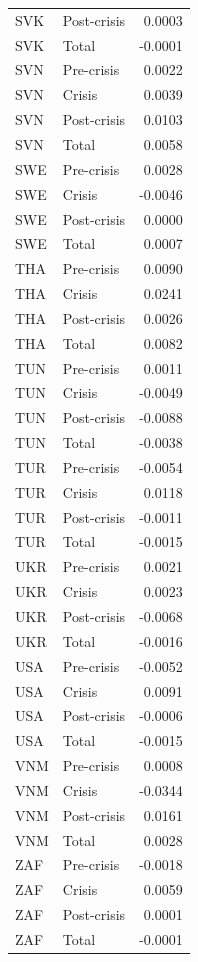\begin{longtable}[t]{llr}
SVK & Post-crisis & 0.0003\\
SVK & Total & -0.0001\\
SVN & Pre-crisis & 0.0022\\
\addlinespace
SVN & Crisis & 0.0039\\
SVN & Post-crisis & 0.0103\\
SVN & Total & 0.0058\\
SWE & Pre-crisis & 0.0028\\
SWE & Crisis & -0.0046\\
\addlinespace
SWE & Post-crisis & 0.0000\\
SWE & Total & 0.0007\\
THA & Pre-crisis & 0.0090\\
THA & Crisis & 0.0241\\
THA & Post-crisis & 0.0026\\
\addlinespace
THA & Total & 0.0082\\
TUN & Pre-crisis & 0.0011\\
TUN & Crisis & -0.0049\\
TUN & Post-crisis & -0.0088\\
TUN & Total & -0.0038\\
\addlinespace
TUR & Pre-crisis & -0.0054\\
TUR & Crisis & 0.0118\\
TUR & Post-crisis & -0.0011\\
TUR & Total & -0.0015\\
UKR & Pre-crisis & 0.0021\\
\addlinespace
UKR & Crisis & 0.0023\\
UKR & Post-crisis & -0.0068\\
UKR & Total & -0.0016\\
USA & Pre-crisis & -0.0052\\
USA & Crisis & 0.0091\\
\addlinespace
USA & Post-crisis & -0.0006\\
USA & Total & -0.0015\\
VNM & Pre-crisis & 0.0008\\
VNM & Crisis & -0.0344\\
VNM & Post-crisis & 0.0161\\
\addlinespace
VNM & Total & 0.0028\\
ZAF & Pre-crisis & -0.0018\\
ZAF & Crisis & 0.0059\\
ZAF & Post-crisis & 0.0001\\
ZAF & Total & -0.0001\\
\bottomrule
\end{longtable}
